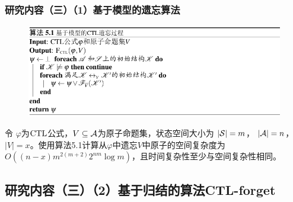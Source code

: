 \documentclass[9pt, CJK]{beamer}
\begin{document}
\begin{frame}
	\frametitle{研究内容（三）（1）基于模型的遗忘算法}
	{\footnotesize 
		
		\begin{figure}
			\includegraphics[scale=0.45]{figures/model-basedAlg}
		\end{figure}
		
		\begin{proposition}\label{pro:time:alg1}
			令 $\varphi$为$\textrm{CTL}$公式，$V\subseteq {\cal A}$为原子命题集，状态空间大小为 $|{\cal S}|=m$， $|{\cal A}|=n$，$|V|=x$。使用算法5.1计算从$\varphi$中遗忘$V$中原子的空间复杂度为 $O((n-x)m^{2(m+2)}2^{nm}  \log m)$，且时间复杂性至少与空间复杂性相同。
		\end{proposition}
	}
\end{frame}

 

\subsection{研究内容（三）（2）基于归结的算法CTL-forget}
 
\end{document}
